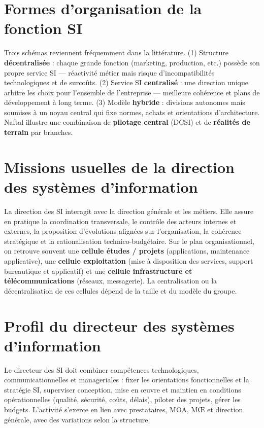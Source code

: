 \section{Formes d'organisation de la fonction SI}
Trois schémas reviennent fréquemment dans la littérature. (1) Structure \textbf{décentralisée} :
chaque grande fonction (marketing, production, etc.) possède son propre service SI — réactivité
métier mais risque d'incompatibilités technologiques et de surcoûts. (2) Service SI
\textbf{centralisé} : une direction unique arbitre les choix pour l'ensemble de l'entreprise —
meilleure cohérence et plans de développement à long terme. (3) Modèle \textbf{hybride} :
divisions autonomes mais soumises à un noyau central qui fixe normes, achats et orientations
d'architecture. Naftal illustre une combinaison de \textbf{pilotage central} (DCSI) et de
\textbf{réalités de terrain} par branches.

\section{Missions usuelles de la direction des systèmes d'information}
La direction des SI interagit avec la direction générale et les métiers. Elle assure en pratique
la coordination transversale, le contrôle des acteurs internes et externes, la proposition
d'évolutions alignées sur l'organisation, la cohérence stratégique et la rationalisation
technico-budgétaire. Sur le plan organisationnel, on retrouve souvent une \textbf{cellule
études / projets} (applications, maintenance applicative), une \textbf{cellule exploitation}
(mise à disposition des services, support bureautique et applicatif) et une \textbf{cellule
infrastructure et télécommunications} (réseaux, messagerie). La centralisation ou la
décentralisation de ces cellules dépend de la taille et du modèle du groupe.

\section{Profil du directeur des systèmes d'information}
Le directeur des SI doit combiner compétences technologiques, communicationnelles et
manageriales : fixer les orientations fonctionnelles et la stratégie SI, superviser conception,
mise en œuvre et maintien en conditions opérationnelles (qualité, sécurité, coûts, délais),
piloter des projets, gérer les budgets. L'activité s'exerce en lien avec prestataires, MOA, MŒ
et direction générale, avec des variations selon la structure.

